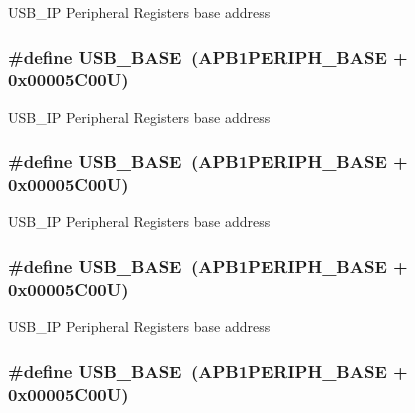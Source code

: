U\-S\-B\-\_\-\-I\-P Peripheral Registers base address \hypertarget{group___peripheral__memory__map_gaa6c4cbed4ddbb3ecd77de93fab2a2e04}{
\subsubsection[{U\-S\-B\-\_\-\-B\-A\-S\-E}]{\setlength{\rightskip}{0pt plus 5cm}\#define U\-S\-B\-\_\-\-B\-A\-S\-E~(A\-P\-B1\-P\-E\-R\-I\-P\-H\-\_\-\-B\-A\-S\-E + 0x00005\-C00\-U)}}\label{group___peripheral__memory__map_gaa6c4cbed4ddbb3ecd77de93fab2a2e04}
U\-S\-B\-\_\-\-I\-P Peripheral Registers base address \hypertarget{group___peripheral__memory__map_gaa6c4cbed4ddbb3ecd77de93fab2a2e04}{
\subsubsection[{U\-S\-B\-\_\-\-B\-A\-S\-E}]{\setlength{\rightskip}{0pt plus 5cm}\#define U\-S\-B\-\_\-\-B\-A\-S\-E~(A\-P\-B1\-P\-E\-R\-I\-P\-H\-\_\-\-B\-A\-S\-E + 0x00005\-C00\-U)}}\label{group___peripheral__memory__map_gaa6c4cbed4ddbb3ecd77de93fab2a2e04}
U\-S\-B\-\_\-\-I\-P Peripheral Registers base address \hypertarget{group___peripheral__memory__map_gaa6c4cbed4ddbb3ecd77de93fab2a2e04}{
\subsubsection[{U\-S\-B\-\_\-\-B\-A\-S\-E}]{\setlength{\rightskip}{0pt plus 5cm}\#define U\-S\-B\-\_\-\-B\-A\-S\-E~(A\-P\-B1\-P\-E\-R\-I\-P\-H\-\_\-\-B\-A\-S\-E + 0x00005\-C00\-U)}}\label{group___peripheral__memory__map_gaa6c4cbed4ddbb3ecd77de93fab2a2e04}
U\-S\-B\-\_\-\-I\-P Peripheral Registers base address \hypertarget{group___peripheral__memory__map_gaa6c4cbed4ddbb3ecd77de93fab2a2e04}{
\subsubsection[{U\-S\-B\-\_\-\-B\-A\-S\-E}]{\setlength{\rightskip}{0pt plus 5cm}\#define U\-S\-B\-\_\-\-B\-A\-S\-E~(A\-P\-B1\-P\-E\-R\-I\-P\-H\-\_\-\-B\-A\-S\-E + 0x00005\-C00\-U)}}\label{group___peripheral__memory__map_gaa6c4cbed4ddbb3ecd77de93fab2a2e04}
